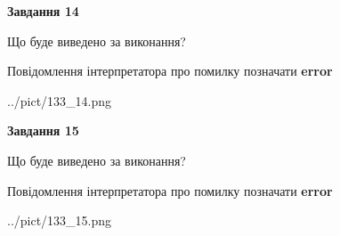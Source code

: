 \documentclass[11pt, ukrainian]{article}
\begin{document}
{\begin {large}
{\begin {center}\textbf{Завдання 14}\end {center}}\par
Що буде виведено за виконання? \par
Повідомлення інтерпретатора про помилку позначати \textbf{error}

\begin{center}
	{../pict/133_14.png}
\end{center}
\newpage

{\begin {center}\textbf{Завдання 15}\end {center}}\par
Що буде виведено за виконання? \par
Повідомлення інтерпретатора про помилку позначати \textbf{error}

\begin{center}
	{../pict/133_15.png}
\end{center}
\newpage

\end {large}}
\end{document}

